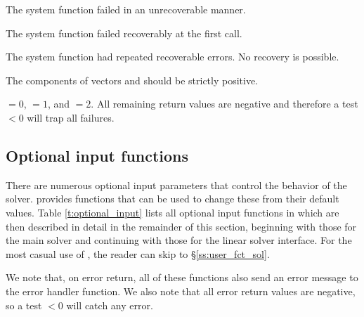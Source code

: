 {\begin{args}[a]
  \item[\Id{KIN\_SYSFUNC\_FAIL}]\rule{0pt}{0pt}

    The system function failed in an unrecoverable manner.

  \item[\Id{KIN\_FIRST\_SYSFUNC\_ERR}]\rule{0pt}{0pt}

    The system function failed recoverably at the first call.

  \item[\Id{KIN\_REPTD\_SYSFUNC\_ERR}]\rule{0pt}{0pt}

    The system function had repeated recoverable errors. No recovery is possible.


  \end{args}
}
{
  The components of vectors  and  should be strictly positive.

   $=0$,  $=1$, and
   $=2$.
  All remaining return values are negative and therefore a test  $< 0$
  will trap all  failures.
}


\subsection{Optional input functions}\label{ss:optional_input}

There are numerous optional input parameters that control the behavior
of the {\kinsol} solver.  {\kinsol} provides functions that can be used
to change these from their default values.  Table \ref{t:optional_input}
lists all optional input functions in {\kinsol} which are then
described in detail in the remainder of this section, beginning with
those for the main {\kinsol} solver and continuing with those for the
{\kinls} linear solver interface. For the most casual use of {\kinsol}, the
reader can skip to \S\ref{ss:user_fct_sol}.

We note that, on error return, all of these functions also send an error message
to the error handler function.
We also note that all error return values are negative, so a test  $<0$
will catch any error.

